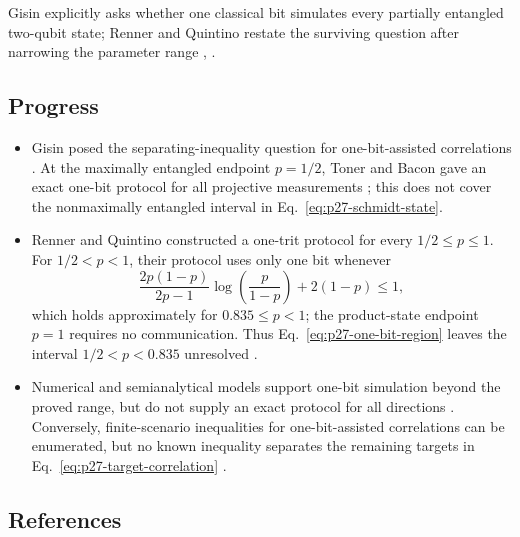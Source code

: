 Gisin explicitly asks whether one classical bit simulates every partially
entangled two-qubit state; Renner and Quintino restate the surviving question
after narrowing the parameter range
,
.

\subsection*{Progress}

\begin{itemize}
  \item Gisin posed the separating-inequality question for one-bit-assisted
  correlations .  At the maximally entangled
  endpoint $p=1/2$, Toner and Bacon gave an exact one-bit protocol for all
  projective measurements ; this does
  not cover the nonmaximally entangled interval in
  Eq.~\eqref{eq:p27-schmidt-state}.

  \item Renner and Quintino constructed a one-trit protocol for every
  $1/2\leq p\leq1$.  For $1/2<p<1$, their protocol uses only one bit whenever
  \begin{equation}
    \frac{2p(1-p)}{2p-1}\log\!\left(\frac{p}{1-p}\right)+2(1-p)\leq1,
    \label{eq:p27-one-bit-region}
  \end{equation}
  which holds approximately for $0.835\leq p<1$; the product-state endpoint
  $p=1$ requires no communication.  Thus
  Eq.~\eqref{eq:p27-one-bit-region} leaves the interval
  $1/2<p<0.835$ unresolved .

  \item Numerical and semianalytical models support one-bit simulation beyond
  the proved range, but do not supply an exact protocol for all directions
  .  Conversely, finite-scenario
  inequalities for one-bit-assisted correlations can be enumerated, but no
  known inequality separates the remaining targets in
  Eq.~\eqref{eq:p27-target-correlation}
  .
\end{itemize}

\subsection*{References}

